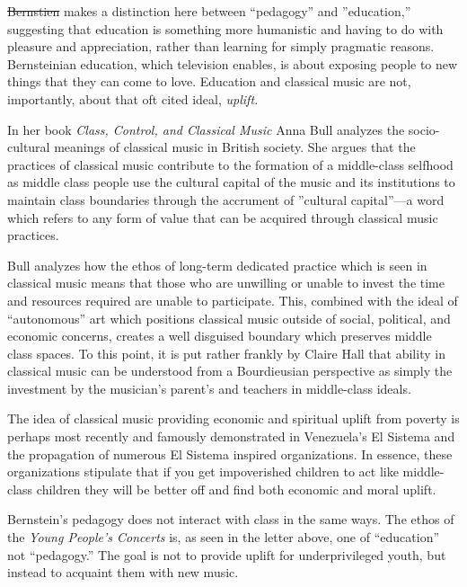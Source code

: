 \documentclass[12pt,letterpaper]{article}
\providecommand{\DIFadd}[1]{{\protect\color{blue}\uwave{#1}}} %
\providecommand{\DIFdel}[1]{{\protect\color{red}\sout{#1}}}                      %
\providecommand{\DIFaddbegin}{} %
\providecommand{\DIFaddend}{} %
\providecommand{\DIFdelbegin}{} %
\providecommand{\DIFdelend}{} %
\newcommand{\DIFscaledelfig}{0.5}
\newlength{\DIFdelgraphicswidth} %
\newlength{\DIFdelgraphicsheight} %
\newcommand{\DIFaddincludegraphics}[2][]{{\color{blue}\fbox{\DIFOincludegraphics[#1]{#2}}}} %
\newcommand{\DIFdelincludegraphics}[2][]{%
\sbox{\DIFdelgraphicsbox}{\DIFOincludegraphics[#1]{#2}}%
\settoboxwidth{\DIFdelgraphicswidth}{\DIFdelgraphicsbox} %
\settoboxtotalheight{\DIFdelgraphicsheight}{\DIFdelgraphicsbox} %
\scalebox{\DIFscaledelfig}{%
\parbox[b]{\DIFdelgraphicswidth}{\usebox{\DIFdelgraphicsbox}\\[-\baselineskip] \rule{\DIFdelgraphicswidth}{0em}}\llap{\resizebox{\DIFdelgraphicswidth}{\DIFdelgraphicsheight}{%
\setlength{\unitlength}{\DIFdelgraphicswidth}%
\begin{picture}(1,1)%
\thicklines\linethickness{2pt} %
{\color[rgb]{1,0,0}\put(0,0){\framebox(1,1){}}}%
{\color[rgb]{1,0,0}\put(0,0){\line( 1,1){1}}}%
{\color[rgb]{1,0,0}\put(0,1){\line(1,-1){1}}}%
\end{picture}%
}\hspace*{3pt}}} %
} %
\DeclareRobustCommand{\DIFaddbegin}{\DIFOaddbegin \let\includegraphics\DIFaddincludegraphics} %
\DeclareRobustCommand{\DIFaddend}{\DIFOaddend \let\includegraphics\DIFOincludegraphics} %
\DeclareRobustCommand{\DIFdelbegin}{\DIFOdelbegin \let\includegraphics\DIFdelincludegraphics} %
\DeclareRobustCommand{\DIFdelend}{\DIFOaddend \let\includegraphics\DIFOincludegraphics} %
\begin{document}
	\DIFdelbegin \DIFdel{Bernstien }\DIFdelend \DIFaddbegin \DIFadd{Bernstein }\DIFaddend makes a distinction here between ``pedagogy'' and 
	''education,'' suggesting that education is something more humanistic 
	and having to do with pleasure and appreciation, rather than learning 
	for simply pragmatic reasons. Bernsteinian education, which television 
	enables, is about exposing people to new things that they can come to 
	love. Education and classical music are not, importantly, about 
	that oft cited ideal, \textit{uplift.} 

	In her book \textit{Class, Control, and Classical Music} Anna Bull 
	analyzes the socio-cultural meanings of classical music in British
	society. She argues that the practices of classical music contribute to
	the formation of a middle-class selfhood as middle class people use the
	cultural capital of the music and its institutions to maintain class
	boundaries through the accrument of ''cultural capital''---a word which
	refers to any form of value that can be acquired through classical music 
	practices.\autocite[4]{Bull}\autocite[3]{Bull}

	Bull analyzes how the ethos of long-term dedicated practice which is 
	seen in classical music means that those who are unwilling or unable to
	invest the time and resources required are unable to participate.
	This, combined with the ideal of ``autonomous'' art which 
	positions classical music outside of social, political, and economic 
	concerns, creates a well disguised boundary which preserves middle 
	class spaces.\autocite[6]{Bull} To this point, it is put rather frankly
	 by Claire Hall that ability in classical music can be 
	understood from a Bourdieusian perspective as simply the investment by 
	the musician's parent's and teachers in middle-class 
	ideals.\autocite[7]{Bull}
	\DIFdelbegin %

\DIFdelend The idea of classical music providing economic and spiritual uplift from
	poverty is perhaps most recently and famously demonstrated in 
	Venezuela's El Sistema and the propagation of numerous El Sistema 
	inspired organizations.  In essence, these organizations stipulate that
	if you get impoverished children to act like middle-class children they
	will be better off and find both economic and moral uplift.  

	Bernstein's pedagogy does not interact with class in the same ways. 
	The ethos of the \textit{Young People's Concerts} is, as seen in the
	letter above, one of ``education'' not ``pedagogy.'' 
	The goal is not to provide uplift for
	underprivileged youth, but instead to acquaint them with new music.   
\end{document}
